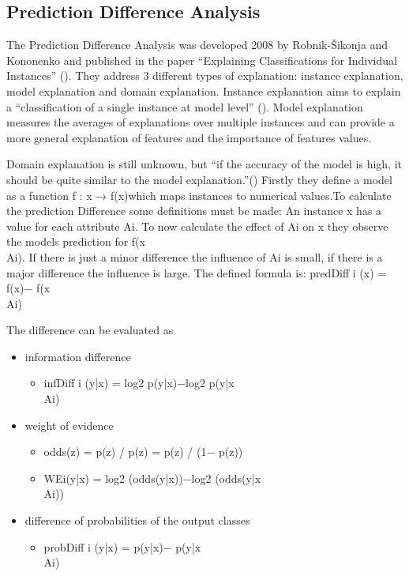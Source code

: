 \subsection{Prediction Difference Analysis}
The Prediction Difference Analysis was developed 2008 by Robnik-Šikonja and Kononenko and published in the paper “Explaining Classifications for Individual Instances” (). They address 3 different types of explanation: instance explanation, model explanation and domain explanation.  Instance explanation aims to explain a “classification of a single instance at model level” (). Model explanation measures the averages of explanations over multiple instances and can provide a more general explanation of features and the importance of features values.
\par
Domain explanation is still unknown, but “if the accuracy of the model is high, it should be quite similar to the model explanation.”() Firstly they define a model as a function f : x → f(x)which maps instances to numerical values.To calculate the prediction Difference some definitions must be made: An instance x has a value for each attribute Ai. To now calculate the effect of Ai on x they observe the models prediction for  f(x\\Ai). 
If there is just a minor difference the influence of Ai is small, if there is a major difference the influence is large. The defined formula is:
predDiff i (x) = f(x)− f(x\\Ai) 
\par
The difference can be evaluated as 
\begin{itemize}
    \item information difference
        \begin{itemize}
                \item infDiff i (y|x) = log2 p(y|x)−log2 p(y|x\\Ai)
        \end{itemize}
    \item weight of evidence 
        \begin{itemize}
                \item odds(z) = p(z) / p(z) = p(z) / (1− p(z))
                \item WEi(y|x) = log2 (odds(y|x))−log2 (odds(y|x\\Ai))
        \end{itemize}
    \item difference of probabilities of the output classes
        \begin{itemize}
                \item probDiff i (y|x) = p(y|x)− p(y|x\\Ai)
        \end{itemize}
\end{itemize}
